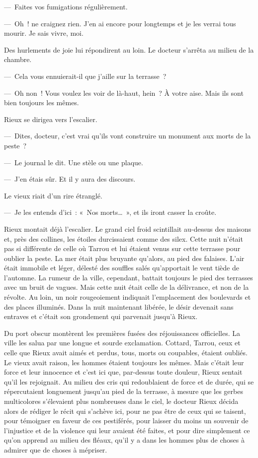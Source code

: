 \documentclass[french,twoside]{book} %
\begin{document}
— Faites vos fumigations régulièrement.\par
— Oh ! ne craignez rien. J’en ai encore pour longtemps et je les verrai tous mourir. Je sais vivre, moi.\par
Des hurlements de joie lui répondirent au loin. Le docteur s’arrêta au milieu de la chambre.\par
— Cela vous ennuierait-il que j’aille sur la terrasse ?\par
— Oh non ! Vous voulez les voir de là-haut, hein ? À votre aise. Mais ils sont bien toujours les mêmes.\par
Rieux se dirigea vers l’escalier.\par
— Dites, docteur, c’est vrai qu’ils vont construire un monument aux morts de la peste ?\par
— Le journal le dit. Une stèle ou une plaque.\par
— J’en étais sûr. Et il y aura des discours.\par
Le vieux riait d’un rire étranglé.\par
— Je les entends d’ici : « Nos morts… », et ils iront casser la croûte.\par
Rieux montait déjà l’escalier. Le grand ciel froid scintillait au-dessus des maisons et, près des collines, les étoiles durcissaient comme des silex. Cette nuit n’était pas si différente de celle où Tarrou et lui étaient venus sur cette terrasse pour oublier la peste. La mer était plus bruyante qu’alors, au pied des falaises. L’air était immobile et léger, délesté des souffles salés qu’apportait le vent tiède de l’automne. La rumeur de la ville, cependant, battait toujours le pied des terrasses avec un bruit de vagues. Mais cette nuit était celle de la délivrance, et non de la révolte. Au loin, un noir rougeoiement indiquait l’emplacement des boulevards et des places illuminés. Dans la nuit maintenant libérée, le désir devenait sans entraves et c’était son grondement qui parvenait jusqu’à Rieux.\par
Du port obscur montèrent les premières fusées des réjouissances officielles. La ville les salua par une longue et sourde exclamation. Cottard, Tarrou, ceux et celle que Rieux avait aimés et perdus, tous, morts ou coupables, étaient oubliés. Le vieux avait raison, les hommes étaient toujours les mêmes. Mais c’était leur force et leur innocence et c’est ici que, par-dessus toute douleur, Rieux sentait qu’il les rejoignait. Au milieu des cris qui redoublaient de force et de durée, qui se répercutaient longuement jusqu’au pied de la terrasse, à mesure que les gerbes multicolores s’élevaient plus nombreuses dans le ciel, le docteur Rieux décida alors de rédiger le récit qui s’achève ici, pour ne pas être de ceux qui se taisent, pour témoigner en faveur de ces pestiférés, pour laisser du moins un souvenir de l’injustice et de la violence qui leur avaient été faites, et pour dire simplement ce qu’on apprend au milieu des fléaux, qu’il y a dans les hommes plus de choses à admirer que de choses à mépriser.\par
\end{document}
